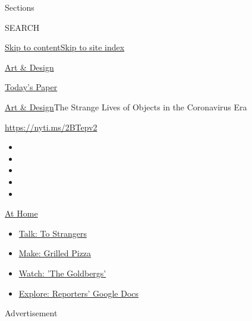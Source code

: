 Sections

SEARCH

\protect\hyperlink{site-content}{Skip to
content}\protect\hyperlink{site-index}{Skip to site index}

\href{https://www.nytimes.com/section/arts/design}{Art \& Design}

\href{https://myaccount.nytimes.com/auth/login?response_type=cookie\&client_id=vi}{}

\href{https://www.nytimes.com/section/todayspaper}{Today's Paper}

\href{/section/arts/design}{Art \& Design}\textbar{}The Strange Lives of
Objects in the Coronavirus Era

\url{https://nyti.ms/2BTepv2}

\begin{itemize}
\item
\item
\item
\item
\item
\end{itemize}

\href{https://www.nytimes.com/spotlight/at-home?action=click\&pgtype=Article\&state=default\&region=TOP_BANNER\&context=at_home_menu}{At
Home}

\begin{itemize}
\tightlist
\item
  \href{https://www.nytimes.com/2020/08/03/well/family/the-benefits-of-talking-to-strangers.html?action=click\&pgtype=Article\&state=default\&region=TOP_BANNER\&context=at_home_menu}{Talk:
  To Strangers}
\item
  \href{https://www.nytimes.com/2020/08/01/at-home/coronavirus-make-pizza-on-a-grill.html?action=click\&pgtype=Article\&state=default\&region=TOP_BANNER\&context=at_home_menu}{Make:
  Grilled Pizza}
\item
  \href{https://www.nytimes.com/2020/07/31/arts/television/goldbergs-abc-stream.html?action=click\&pgtype=Article\&state=default\&region=TOP_BANNER\&context=at_home_menu}{Watch:
  'The Goldbergs'}
\item
  \href{https://www.nytimes.com/interactive/2020/at-home/even-more-reporters-editors-diaries-lists-recommendations.html?action=click\&pgtype=Article\&state=default\&region=TOP_BANNER\&context=at_home_menu}{Explore:
  Reporters' Google Docs}
\end{itemize}

Advertisement

